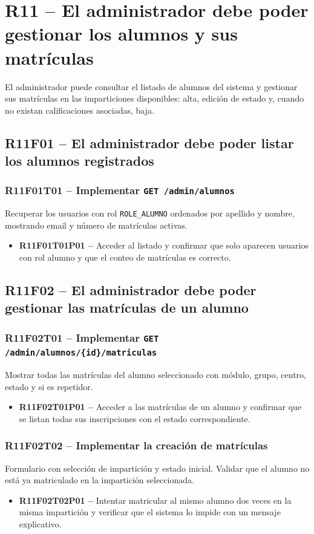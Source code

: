 \documentclass[12pt, a4paper]{report}
\begin{document}
\section{R11 -- El administrador debe poder gestionar los alumnos y sus matrículas}

El administrador puede consultar el listado de alumnos del sistema y gestionar sus matrículas en las imparticiones disponibles: alta, edición de estado y, cuando no existan calificaciones asociadas, baja.

\subsection{R11F01 -- El administrador debe poder listar los alumnos registrados}

\subsubsection{R11F01T01 -- Implementar \texttt{GET /admin/alumnos}}
Recuperar los usuarios con rol \texttt{ROLE\_ALUMNO} ordenados por apellido y nombre, mostrando email y número de matrículas activas.
\begin{itemize}
  \item \textbf{R11F01T01P01 --} Acceder al listado y confirmar que solo aparecen usuarios con rol alumno y que el conteo de matrículas es correcto.
\end{itemize}

\subsection{R11F02 -- El administrador debe poder gestionar las matrículas de un alumno}

\subsubsection{R11F02T01 -- Implementar \texttt{GET /admin/alumnos/\{id\}/matriculas}}
Mostrar todas las matrículas del alumno seleccionado con módulo, grupo, centro, estado y si es repetidor.
\begin{itemize}
  \item \textbf{R11F02T01P01 --} Acceder a las matrículas de un alumno y confirmar que se listan todas sus inscripciones con el estado correspondiente.
\end{itemize}

\subsubsection{R11F02T02 -- Implementar la creación de matrículas}
Formulario con selección de impartición y estado inicial. Validar que el alumno no está ya matriculado en la impartición seleccionada.
\begin{itemize}
  \item \textbf{R11F02T02P01 --} Intentar matricular al mismo alumno dos veces en la misma impartición y verificar que el sistema lo impide con un mensaje explicativo.
\end{itemize}
\end{document}
